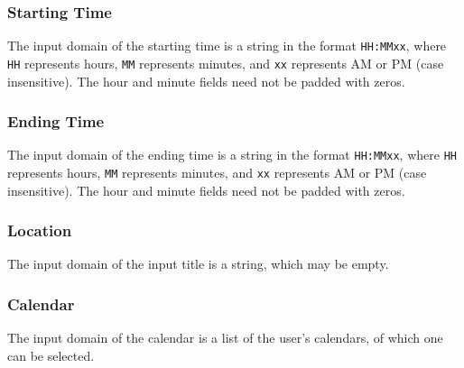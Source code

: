 \documentclass[10pt,letterpaper]{article}
\begin{document}
\subsubsection{Starting Time}
The input domain of the starting time is a string in the format \texttt{HH:MMxx}, where \texttt{HH} represents hours, \texttt{MM} represents minutes, and \texttt{xx} represents AM or PM (case insensitive). The hour and minute fields need not be padded with zeros.

\subsubsection{Ending Time}
The input domain of the ending time is a string in the format \texttt{HH:MMxx}, where \texttt{HH} represents hours, \texttt{MM} represents minutes, and \texttt{xx} represents AM or PM (case insensitive). The hour and minute fields need not be padded with zeros.

\subsubsection{Location}
The input domain of the input title is a string, which may be empty.

\subsubsection{Calendar}
The input domain of the calendar is a list of the user's calendars, of which one can be selected.
\end{document}
